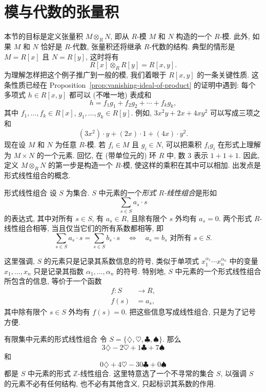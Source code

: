 \section{模与代数的张量积}\label{sec:tensor-products-of-modules}

本节的目标是定义张量积 $M\otimes_{R}N$, 即从 $R$-模 $M$ 和 $N$ 构造的一个 $R$-模. 此外, 如果 $M$ 和 $N$ 恰好是 $R$-代数, 张量积还将继承 $R$-代数的结构. 典型的情形是 $M=R[x]$ 且 $N=R[y]$, 这时将有
\[
  R[x]\otimes_{R}R[y]=R[x,y].
\]
为理解怎样把这个例子推广到一般的模, 我们着眼于 $R[x,y]$ 的一条关键性质. 这条性质已经在 Proposition~\ref{prop:vanishing-ideal-of-product} 的证明中遇到: 每个多项式 $h\in R[x,y]$ 都可以 (不唯一地) 表成和
\[
  h=f_{1}g_{1}+f_{2}g_{2}+\cdots+f_{k}g_{k},
\]
其中 $f_{1},\ldots,f_{k}\in R[x]$, $g_{1},\ldots,g_{k}\in R[y]$. 例如, $3x^{2}y+2x+4xy^{2}$ 可以写成三项之和
\[
  (3x^{2})\cdot y+(2x)\cdot1+(4x)\cdot y^{2}.
\]
\BookPairedNote
  {现在设 $M$ 和 $N$ 为任意 $R$-模. 若 $f_{i}\in M$ 且 $g_{i}\in N$, 可以把\textquotedbl{}乘积\textquotedbl{} $f_{i}g_{i}$ 在形式上理解为 $M\times N$ 的一个元素.}
  {回忆, 在 (带单位元的) 环 $R$ 中, 数 $3$ 表示 $1+1+1$.}
因此, 定义 $M\otimes_{R}N$ 的第一步是构造一个 $R$-模, 使这样的乘积在其中可以相加. 出发点是形式线性组合的概念.

\begin{Definition}{形式线性组合}\leavevmode\label{def:formal-linear-combination}
设 $S$ 为集合. $S$ 中元素的一个\emph{形式 $R$-线性组合}是形如
\[
  \sum_{s\in S}a_{s}\cdot s
\]
的表达式, 其中对所有 $s\in S$, 有 $a_{s}\in R$, 且除有限个 $s$ 外均有 $a_{s}=0$. 两个形式 $R$-线性组合相等, 当且仅当它们的所有系数都相等, 即
\[
  \sum_{s\in S}a_{s}\cdot s=\sum_{s\in S}b_{s}\cdot s
  \quad\Longleftrightarrow\quad a_{s}=b_{s}\text{ 对所有 }s\in S.
\]
\end{Definition}

这里强调, $S$ 的元素只是记录其系数信息的符号, 类似于单项式 $x_{1}^{\alpha_{1}}\cdots x_{n}^{\alpha_{n}}$ 中的变量 $x_{1},\ldots,x_{n}$ 只是记录其指数 $\alpha_{1},\ldots,\alpha_{n}$ 的符号. 特别地, $S$ 中元素的一个形式线性组合所包含的信息, 等价于一个函数
\[
  \begin{aligned}
    f:S&\to R,\\
    f(s)&=a_{s},
  \end{aligned}
\]
其中除有限个 $s\in S$ 外均有 $f(s)=0$. 把这些信息写成线性组合, 只是为了记号方便.

\begin{Example}{有限集中元素的形式线性组合}\leavevmode\label{ex:formal-linear-combinations-on-finite-set}
\BookPairedNote
  {令 $S=\{\diamondsuit,\heartsuit,\clubsuit,\spadesuit\}$. 那么
  \[
    3\diamondsuit-2\heartsuit+1\clubsuit+7\spadesuit
  \]
  和
  \[
    0\diamondsuit+4\heartsuit-30\clubsuit+0\spadesuit
  \]
  都是 $S$ 中元素的形式 $\mathbb{Z}$-线性组合.}
  {这里特意选了一个不寻常的集合 $S$, 以强调 $S$ 的元素不必有任何结构, 也不必有其他含义, 只起标识其系数的作用.}
\end{Example}

